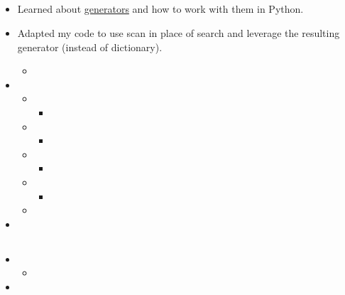 \documentclass{weeklyreport}
\begin{document}
\subsection*{}

\begin{itemize}
    \item Learned about \href{https://realpython.com/introduction-to-python-generators/}{generators} and how to work with them in Python.
    \item Adapted my code to use scan in place of search and leverage the resulting generator (instead of dictionary).
    \begin{itemize}
    	\item 
    \end{itemize}
    \item 
    \begin{itemize}
    	\item 
    	\begin{itemize}
    		\item 
    	\end{itemize}
    	\item 
    	\begin{itemize}
    		\item 
    	\end{itemize}
    	\item 
    	\begin{itemize}
    		\item 
    	\end{itemize}
    	\item 
    	\begin{itemize}
    		\item 	
		\end{itemize}    	 
    	
    	\item 
    \end{itemize}
    \item 
\end{itemize}


\subsection*{}

\begin{itemize}
    \item 
    \begin{itemize}
    	\item 
    \end{itemize}
    \item 
\end{itemize}
\end{document}
